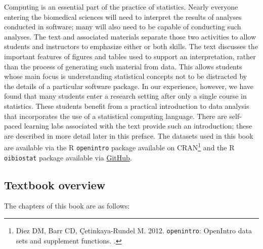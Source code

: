 Computing is an essential part of the practice of statistics.  Nearly everyone entering the biomedical sciences will need to interpret the results of analyses conducted in software; many will also need to be capable of conducting such analyses. The text and associated materials separate those two activities to allow students and instructors to emphasize either or both skills. The text discusses the important features of figures and tables used to support an interpretation, rather than the process of generating such material from data. This allows students whose main focus is understanding statistical concepts not to be distracted by the details of a particular software package. In our experience, however, we have found that many students enter a research setting after only a single course in statistics. These students benefit from a practical introduction to data analysis that incorporates the use of a statistical computing language. There are self-paced learning labs associated with the text provide such an introduction; these are described in more detail later in this preface. The datasets used in this book are available via the \textsf{R} \texttt{openintro} package available on CRAN\footnote{Diez DM, Barr CD, \c{C}etinkaya-Rundel M. 2012. \texttt{openintro}: OpenIntro data sets and supplement functions. .}  and the \textsf{R} \texttt{oibiostat} package available via \href{<https://github.com/OI-Biostat/oi_biostat_data>}{GitHub}.

\subsection*{Textbook overview}

The chapters of this book are as follows:


